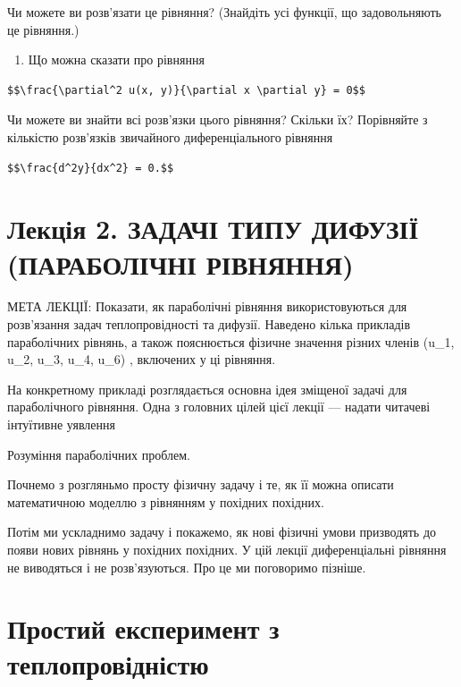 \documentclass[
  ukrainian,
]{article}
\providecommand{\tightlist}{%
  \setlength{\itemsep}{0pt}\setlength{\parskip}{0pt}}
\begin{document}
Чи можете ви розв'язати це рівняння? (Знайдіть усі функції, що
задовольняють це рівняння.)

\begin{enumerate}
\def\labelenumi{\arabic{enumi}.}
\setcounter{enumi}{4}
\tightlist
\item
  Що можна сказати про рівняння
\end{enumerate}

\begin{verbatim}
$$\frac{\partial^2 u(x, y)}{\partial x \partial y} = 0$$
\end{verbatim}

Чи можете ви знайти всі розв'язки цього рівняння? Скільки їх? Порівняйте
з кількістю розв'язків звичайного диференціального рівняння

\begin{verbatim}
$$\frac{d^2y}{dx^2} = 0.$$
\end{verbatim}

\section{Лекція 2. ЗАДАЧІ ТИПУ ДИФУЗІЇ (ПАРАБОЛІЧНІ
РІВНЯННЯ)}\label{ux43bux435ux43aux446ux456ux44f-2.-ux437ux430ux434ux430ux447ux456-ux442ux438ux43fux443-ux434ux438ux444ux443ux437ux456ux457-ux43fux430ux440ux430ux431ux43eux43bux456ux447ux43dux456-ux440ux456ux432ux43dux44fux43dux43dux44f}

МЕТА ЛЕКЦІЇ: Показати, як параболічні рівняння використовуються для
розв'язання задач теплопровідності та дифузії. Наведено кілька прикладів
параболічних рівнянь, а також пояснюється фізичне значення різних членів
(u\_1, u\_2, u\_3, u\_4, u\_6) , включених у ці рівняння.

На конкретному прикладі розглядається основна ідея зміщеної задачі для
параболічного рівняння. Одна з головних цілей цієї лекції --- надати
читачеві інтуїтивне уявлення

Розуміння параболічних проблем.

Почнемо з розгляньмо просту фізичну задачу і те, як її можна описати
математичною моделлю з рівнянням у похідних похідних.

Потім ми ускладнимо задачу і покажемо, як нові фізичні умови призводять
до появи нових рівнянь у похідних похідних. У цій лекції диференціальні
рівняння не виводяться і не розв'язуються. Про це ми поговоримо пізніше.

\section{Простий експеримент з
теплопровідністю}\label{ux43fux440ux43eux441ux442ux438ux439-ux435ux43aux441ux43fux435ux440ux438ux43cux435ux43dux442-ux437-ux442ux435ux43fux43bux43eux43fux440ux43eux432ux456ux434ux43dux456ux441ux442ux44e}
\end{document}
